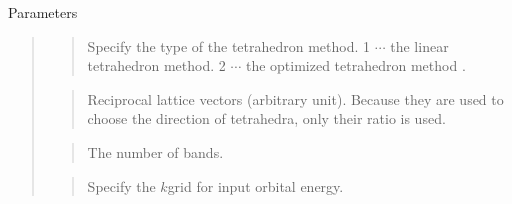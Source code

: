 \documentclass[letterpaper,10pt,pdftex,openany,english]{sphinxmanual}
\begin{document}
\sphinxAtStartPar
Parameters
\begin{quote}

\begin{sphinxVerbatim}[commandchars=\\\{\}]
\end{sphinxVerbatim}
\begin{quote}

\sphinxAtStartPar
Specify the type of the tetrahedron method.
1 \(\cdots\) the linear tetrahedron method.
2 \(\cdots\) the optimized tetrahedron method {\hyperref[\detokenize{ref:ref}]{}}.
\end{quote}

\begin{sphinxVerbatim}[commandchars=\\\{\}]
\end{sphinxVerbatim}
\begin{quote}

\sphinxAtStartPar
Reciprocal lattice vectors (arbitrary unit).
Because they are used to choose the direction of tetrahedra,
only their ratio is used.
\end{quote}

\begin{sphinxVerbatim}[commandchars=\\\{\}]
\end{sphinxVerbatim}
\begin{quote}

\sphinxAtStartPar
The number of bands.
\end{quote}

\begin{sphinxVerbatim}[commandchars=\\\{\}]
\end{sphinxVerbatim}
\begin{quote}

\sphinxAtStartPar
Specify the \(k\)\sphinxhyphen{}grid
for input orbital energy.
\end{quote}


\end{quote}
\end{document}
